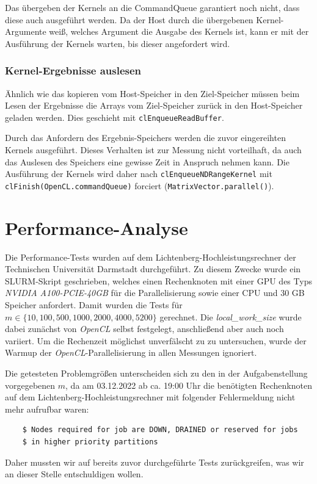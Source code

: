 \documentclass[
	ngerman,
	ruledheaders=section,
	class=report,
	thesis={type=Dokumentation},
	ignore-missing-data=true,
	accentcolor=9c,
	custommargins=false,
	marginpar=false,
	parskip=half-,
	fontsize=11pt,
]{tudapub}
\let\code\texttt
\def\code#1{\texttt{#1}}
\begin{document}
Das übergeben der Kernels an die CommandQueue garantiert noch nicht, dass diese auch ausgeführt werden. Da der Host durch die übergebenen Kernel-Argumente weiß, welches Argument die Ausgabe des Kernels ist, kann er mit der Ausführung der Kernels warten, bis dieser angefordert wird.

\subsection{Kernel-Ergebnisse auslesen}
Ähnlich wie das kopieren vom Host-Speicher in den Ziel-Speicher müssen beim Lesen der Ergebnisse die Arrays vom Ziel-Speicher zurück in den Host-Speicher geladen werden. Dies geschieht mit \code{clEnqueueReadBuffer}.

Durch das Anfordern des Ergebnis-Speichers werden die zuvor eingereihten Kernels ausgeführt. Dieses Verhalten ist zur Messung nicht vorteilhaft, da auch das Auslesen des Speichers eine gewisse Zeit in Anspruch nehmen kann. Die Ausführung der Kernels wird daher nach \code{clEnqueueNDRangeKernel} mit \code{clFinish(OpenCL.commandQueue)} forciert (\code{MatrixVector.parallel()}).

\chapter{Performance-Analyse}
Die Performance-Tests wurden auf dem Lichtenberg-Hochleistungsrechner der Technischen Universität Darmstadt durchgeführt. Zu diesem Zwecke wurde ein SLURM-Skript geschrieben, welches einen Rechenknoten mit einer GPU des Typs \textit{NVIDIA A100-PCIE-40GB} für die Parallelisierung sowie einer CPU und 30 GB Speicher anfordert. Damit wurden die Tests für $m \in \{10, 100, 500, 1000, 2000, 4000, 5200\}$ gerechnet. Die \textit{local\_work\_size} wurde dabei zunächst von \textit{OpenCL} selbst festgelegt, anschließend aber auch noch variiert. Um die Rechenzeit möglichst unverfälscht zu zu untersuchen, wurde der Warmup der \textit{OpenCL}-Parallelisierung in allen Messungen ignoriert.

Die getesteten Problemgrößen unterscheiden sich zu den in der Aufgabenstellung vorgegebenen $m$, da am 03.12.2022 ab ca. 19:00 Uhr die benötigten Rechenknoten auf dem Lichtenberg-Hochleistungsrechner mit folgender Fehlermeldung nicht mehr aufrufbar waren:
\begin{lstlisting}
	$ Nodes required for job are DOWN, DRAINED or reserved for jobs 
	$ in higher priority partitions
\end{lstlisting}
Daher mussten wir auf bereits zuvor durchgeführte Tests zurückgreifen, was wir an dieser Stelle entschuldigen wollen.
\end{document}
